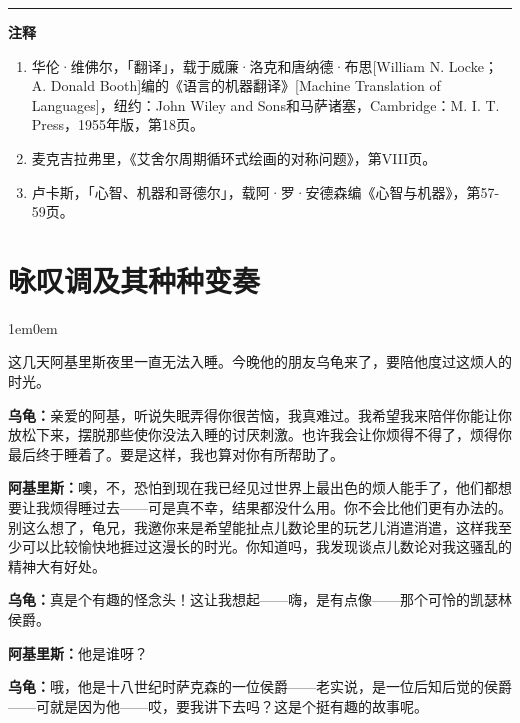 \documentclass[
  12pt,
  twoside,
  openright,
  oldfontcommands,
]{memoir}
\newcommand{\dialogname}[1]{{\heifamily\bfseries #1}}
\newenvironment{dialogguide}{%
  \begin{adjustwidth}{1em}{0em}\kaitifamily\itshape\small%
}{%
  \end{adjustwidth}%
}
\begin{document}
{\footnotesize\setlength{\parindent}{0pt}%
\noindent\textcolor{rulegray}{\rule{0.35\linewidth}{0.3pt}}\par\vspace{2pt}
\noindent\textbf{注释}\par\vspace{3pt}
\begin{enumerate}
\label{fn:Chapter12-1}{}
\item 华伦·维佛尔，「翻译」，载于威廉·洛克和唐纳德·布思[William N. Locke；A. Donald Booth]编的《语言的机器翻译》[Machine Translation of Languages]，纽约：John Wiley and Sons和马萨诸塞，Cambridge：M. I. T. Press，1955年版，第18页。
\label{fn:Chapter12-2}{}
\item 麦克吉拉弗里，《艾舍尔周期循环式绘画的对称问题》，第VIII页。
\label{fn:Chapter12-3}{}
\item 卢卡斯，「心智、机器和哥德尔」，载阿·罗·安德森编《心智与机器》，第57-59页。
\end{enumerate}
}

\label{Dialog13.xhtml}{}

\chapter*{咏叹调及其种种变奏}

\begin{dialogguide}
这几天阿基里斯夜里一直无法入睡。今晚他的朋友乌龟来了，要陪他度过这烦人的时光。
\end{dialogguide}

\dialogname{乌龟：}亲爱的阿基，听说失眠弄得你很苦恼，我真难过。我希望我来陪伴你能让你放松下来，摆脱那些使你没法入睡的讨厌刺激。也许我会让你烦得不得了，烦得你最后终于睡着了。要是这样，我也算对你有所帮助了。

\dialogname{阿基里斯：}噢，不，恐怕到现在我已经见过世界上最出色的烦人能手了，他们都想要让我烦得睡过去------可是真不幸，结果都没什么用。你不会比他们更有办法的。别这么想了，龟兄，我邀你来是希望能扯点儿数论里的玩艺儿消遣消遣，这样我至少可以比较愉快地捱过这漫长的时光。你知道吗，我发现谈点儿数论对我这骚乱的精神大有好处。

\dialogname{乌龟：}真是个有趣的怪念头！这让我想起------嗨，是有点像------那个可怜的凯瑟林侯爵。

\dialogname{阿基里斯：}他是谁呀？

\dialogname{乌龟：}哦，他是十八世纪时萨克森的一位侯爵------老实说，是一位后知后觉的侯爵------可就是因为他------哎，要我讲下去吗？这是个挺有趣的故事呢。
\end{document}
